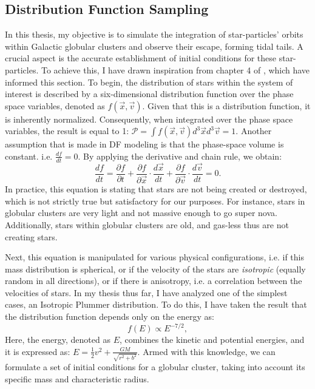 \subsection{Distribution Function Sampling} \label{sec:DistributionFunctionSampling}

In this thesis, my objective is to simulate the integration of star-particles' orbits within Galactic globular clusters and observe their escape, forming tidal tails. A crucial aspect is the accurate establishment of initial conditions for these star-particles. To achieve this, I have drawn inspiration from chapter 4 of \citet{2008gady.book.....B}, which have informed this section. To begin, the distribution of stars within the system of interest is described by a six-dimensional distribution function over the phase space variables, denoted as $f\left(\vec{x},\vec{v}\right)$. Given that this is a distribution function, it is inherently normalized. Consequently, when integrated over the phase space variables, the result is equal to 1: $\mathcal{P}=\int f\left(\vec{x},\vec{v}\right) d^3\vec{x}d^3\vec{v}=1.$ Another assumption that is made in DF modeling is that the phase-space volume is constant. i.e. $\frac{d f}{dt}=0$. By applying the derivative and chain rule, we obtain:
\begin{equation}
    \frac{df}{dt} = \frac{\partial f}{\partial t} + \frac{\partial f}{\partial \vec{x}}\cdot\frac{d\vec{x}}{dt}+\frac{\partial f}{\partial \vec{v}}\cdot\frac{d\vec{v}}{dt} = 0.
\end{equation}
In practice, this equation is stating that stars are not being created or destroyed, which is not strictly true but satisfactory for our purposes. For instance, stars in globular clusters are very light and not massive enough to go super nova. Additionally, stars within globular clusters are old, and gas-less thus are not creating stars. 

Next, this equation is manipulated for various physical configurations, i.e. if this mass distribution is spherical, or if the velocity of the stars are \textit{isotropic} (equally random in all directions), or if there is anisotropy, i.e. a correlation between the velocities of stars. In my thesis thus far, I have analyzed one of the simplest cases, an Isotropic Plummer distribution. To do this, I have taken the result that the distribution function depends only on the energy as:
\begin{equation}\label{EQ:plummerDF}
    f\left(E\right)\propto E^{-7/2},
\end{equation}
Here, the energy, denoted as $E$, combines the kinetic and potential energies, and it is expressed as: $E=\frac{1}{2}v^2 + \frac{GM}{\sqrt{r^2 + b^2}}$. Armed with this knowledge, we can formulate a set of initial conditions for a globular cluster, taking into account its specific mass and characteristic radius.

